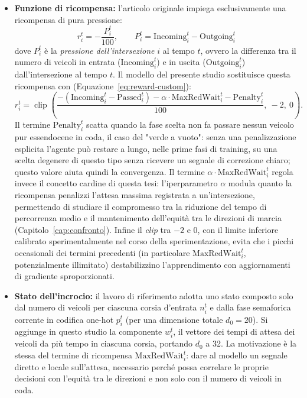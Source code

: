 \begin{itemize}
  \item \textbf{Funzione di ricompensa:} l'articolo originale impiega esclusivamente una ricompensa di pura pressione:
        \begin{equation}
          r_i^t = -\frac{P_i^t}{100}, \qquad P_i^t = \mathrm{Incoming}_i^t - \mathrm{Outgoing}_i^t
          \label{eq:reward-paper}
        \end{equation}
        dove $P_i^t$ è la \emph{pressione dell'intersezione} $i$ al tempo $t$, ovvero la differenza tra il numero di veicoli in entrata ($\mathrm{Incoming}_i^t$) e in uscita ($\mathrm{Outgoing}_i^t$) dall'intersezione al tempo $t$.
        Il modello del presente studio sostituisce questa ricompensa con (Equazione~\ref{eq:reward-custom}):
        \[
          r_i^t = \operatorname{clip}\!\left(
          \frac{-(\mathrm{Incoming}_i^t - \mathrm{Passed}_i^t) - \alpha \cdot \mathrm{MaxRedWait}_i^t - \mathrm{Penalty}_i^t}{100},\ -2,\ 0
          \right).
        \]
        Il termine $\mathrm{Penalty}_i^t$ scatta quando la fase scelta non fa passare nessun veicolo pur essendocene in coda, il caso del "verde a vuoto": senza una penalizzazione esplicita l'agente può restare a lungo, nelle prime fasi di training, su una scelta degenere di questo tipo senza ricevere un segnale di correzione chiaro; questo valore aiuta quindi la convergenza.
        Il termine $\alpha \cdot \mathrm{MaxRedWait}_i^t$ regola invece il concetto cardine di questa tesi: l'iperparametro $\alpha$ modula quanto la ricompensa penalizzi l'attesa massima registrata a un'intersezione, permettendo di studiare il compromesso tra la riduzione del tempo di percorrenza medio e il mantenimento dell'equità tra le direzioni di marcia (Capitolo~\ref{cap:confronto}).
        Infine il \emph{clip} tra $-2$ e $0$, con il limite inferiore calibrato sperimentalmente nel corso della sperimentazione, evita che i picchi occasionali dei termini precedenti (in particolare $\mathrm{MaxRedWait}_i^t$, potenzialmente illimitato) destabilizzino l'apprendimento con aggiornamenti di gradiente sproporzionati.

  \item \textbf{Stato dell'incrocio:} il lavoro di riferimento adotta uno stato composto solo dal numero di veicoli per ciascuna corsia d'entrata $n_i^t$ e dalla fase semaforica corrente in codifica one-hot $p_i^t$ (per una dimensione totale $d_0=20$). Si aggiunge in questo studio la componente $w_i^t$, il vettore dei tempi di attesa dei veicoli da più tempo in ciascuna corsia, portando $d_0$ a 32. La motivazione è la stessa del termine di ricompensa $\mathrm{MaxRedWait}_i^t$: dare al modello un segnale diretto e locale sull'attesa, necessario perché possa correlare le proprie decisioni con l'equità tra le direzioni e non solo con il numero di veicoli in coda.


\end{itemize}
